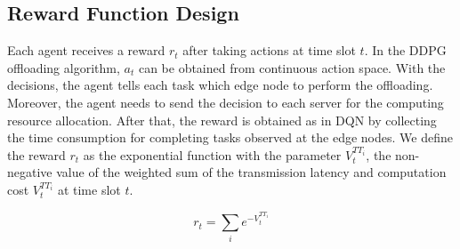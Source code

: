 \documentclass[10pt, conference, letterpaper]{IEEEtran}
\begin{document}
\subsection{Reward Function Design}
Each agent receives a reward $r_{t}$ after taking actions at time slot $t$. In the DDPG offloading algorithm, $a_t$ can be obtained from continuous action space. With the decisions, the agent tells each task which edge node to perform the offloading. Moreover, the agent needs to send the decision to each server for the computing resource allocation. After that, the reward is obtained as in DQN by collecting the time consumption for completing tasks observed at the edge nodes. We define the reward $r_{t}$ as the exponential function with the parameter $V_t^{TT_i}$, the non-negative value of the weighted sum of the transmission latency and computation cost $V_t^{TT_i}$ at time slot $t$.

\begin{equation}
    r_{t} = \sum_i e^{- V_t^{TT_i}}
\end{equation}


\end{document}
